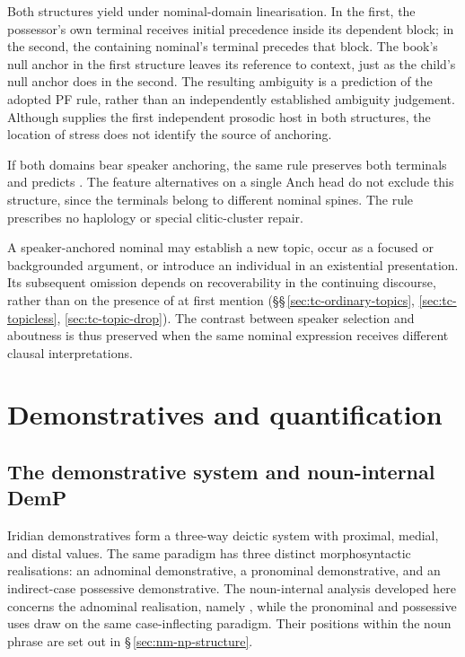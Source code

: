 \noindent Both structures yield  under nominal-domain
linearisation. In the first, the possessor's own terminal receives initial
precedence inside its dependent block; in the second, the containing
nominal's terminal precedes that block. The book's null anchor in the first
structure leaves its reference to context, just as the child's null anchor
does in the second. The resulting ambiguity is a prediction of the adopted
PF rule, rather than an independently established ambiguity judgement.
Although  supplies the first independent prosodic host in both
structures, the location of stress does not identify the source of anchoring.

If both domains bear speaker anchoring, the same rule preserves both terminals
and predicts . The feature alternatives on a single Anch
head do not exclude this structure, since the terminals belong to different
nominal spines. The rule prescribes no haplology or special clitic-cluster repair.

A speaker-anchored nominal may establish a new topic, occur as a focused or
backgrounded argument, or introduce an individual in an existential
presentation. Its subsequent omission depends on recoverability in the
continuing discourse, rather than on the presence of  at first
mention (§§\,\ref{sec:tc-ordinary-topics}, \ref{sec:tc-topicless},
\ref{sec:tc-topic-drop}). The contrast between speaker selection and
aboutness is thus preserved when the same nominal expression receives
different clausal interpretations.

\FloatBarrier

\section{Demonstratives and quantification}
\label{sec:nm-upper}

\subsection{The demonstrative system and noun-internal DemP}
\label{sec:nm-dem}

Iridian demonstratives form a three-way deictic system with proximal, medial,
and distal values. The same paradigm has three distinct morphosyntactic
realisations: an adnominal demonstrative, a pronominal demonstrative, and an
indirect-case possessive demonstrative. The noun-internal analysis developed
here concerns the adnominal realisation, namely , while the pronominal and possessive uses draw on the same
case-inflecting paradigm. Their positions within the noun phrase are set out
in §\,\ref{sec:nm-np-structure}.

